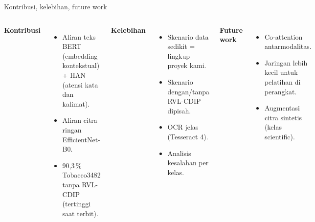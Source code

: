 \documentclass[aspectratio=169,10pt]{beamer}
\newcommand\kecil{\fontsize{8}{9.5}\selectfont}
\begin{document}
\begin{frame}{Kontribusi, kelebihan, future work}
  \begin{columns}[T]
    \textbf{Kontribusi}
    \begin{itemize}\kecil
      \item Aliran teks BERT (embedding kontekstual) + HAN (atensi kata dan kalimat).
      \item Aliran citra ringan EfficientNet-B0.
      \item 90,3\,\% Tobacco3482 tanpa RVL-CDIP (tertinggi saat terbit).
    \end{itemize}
    \textbf{Kelebihan}
    \begin{itemize}\kecil
      \item Skenario data sedikit = lingkup proyek kami.
      \item Skenario dengan/tanpa RVL-CDIP dipisah.
      \item OCR jelas (Tesseract 4).
      \item Analisis kesalahan per kelas.
    \end{itemize}
    \textbf{Future work}
    \begin{itemize}\kecil
      \item Co-attention antarmodalitas.
      \item Jaringan lebih kecil untuk pelatihan di perangkat.
      \item Augmentasi citra sintetis (kelas scientific).
    \end{itemize}
  \end{columns}
\end{frame}
\end{document}
